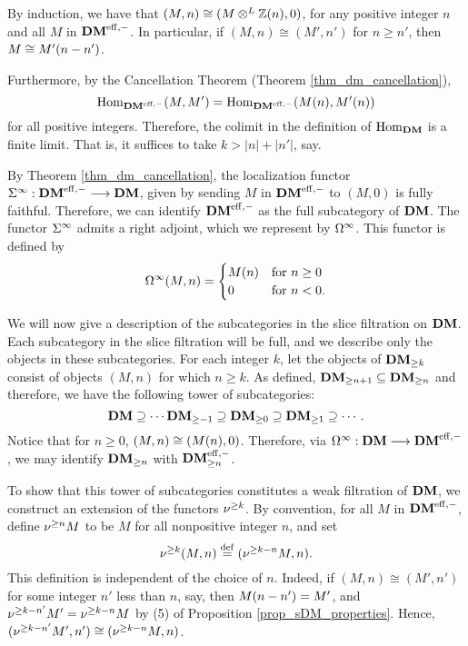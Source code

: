 By induction, we have that $(M, n) \cong (M \tDM \Z(n), 0)$, for 
any positive integer $n$ and all $M$ in $\DMeff$. In particular,
if $(M, n) \cong (M', n')$ for $n \geq n'$, then $M \cong 
\tZ[n - n']{M'}$.

Furthermore, by the Cancellation Theorem (Theorem 
\ref{thm_dm_cancellation}), 
\[
\homDMf(M, M') = \homDMf(\tZ[n]{M}, \tZ[n]{M'})
\]
for all positive integers. Therefore, the colimit in the 
definition of $\homDM$ is a finite limit. That is, it suffices to 
take $k > |n| + |n'|$, say.

By Theorem \ref{thm_dm_cancellation}, the localization functor 
$\spectDM: \DMeff \to \DM$, given by sending $M$ in $\DMeff$ to 
$(M, 0)$ is fully faithful. Therefore, we can identify $\DMeff$ as 
the full subcategory of $\DM$. The functor $\spectDM$ admits a 
right adjoint, which we represent by $\loopDM$. This functor is 
defined by 
\[
\loopDM(M, n) = \begin{cases}
\LHI[n]{M} &\textrm{for }n \geq 0 \\
0 &\textrm{for }n < 0.
\end{cases}
\]

We will now give a description of the subcategories in the slice
filtration on $\DM$. Each subcategory in the slice filtration 
will be full, and we describe only the objects in these 
subcategories. For each integer $k$, let the objects of 
$\GFiltDM[k]{\DM}$ consist of objects $(M, n)$ for which $n \geq 
k$. As defined, $\GFiltDM[n + 1]{\DM} \subseteq \GFiltDM[n]{\DM}$ 
and therefore, we have the following tower of subcategories:
\begin{equation}\label{eq_DM_slice_filt}
\DM \supseteq \cdots \GFiltDM[-1]{\DM} \supseteq \GFiltDM[0]{\DM}
   \supseteq \GFiltDM[1]{\DM} \supseteq \cdots.
\end{equation}
Notice that for $n \geq 0$, $(M, n) \cong (\tZ[n]{M}, 0)$. 
Therefore, via $\loopDM: \DM \to \DMeff$, we may identify 
$\GFiltDM[n]{\DM}$ with $\GFiltDM[n]{\DMeff}$.

To show that this tower of subcategories constitutes a weak 
filtration of $\DM$, we construct an extension of the functors 
$\sgDM{k}$.  By convention, for all $M$ in $\DMeff$, define 
$\sgDM{n} M$ to be $M$ for all nonpositive integer $n$, and set
\[
\sgDM{k}(M, n) \defeq (\sgDM{k - n}M, n).
\]
This definition is independent of the choice of $n$. Indeed, if
$(M, n) \cong (M', n')$ for some integer $n'$ less than $n$, say, 
then $\tZ[n - n']{M} = M'$, and $\sgDM{k - n'}M' = \sgDM{k - n}M$ 
by (5) of Proposition \ref{prop_sDM_properties}. Hence, 
$(\sgDM{k - n'}M', n') \cong (\sgDM{k - n}M, n)$.

